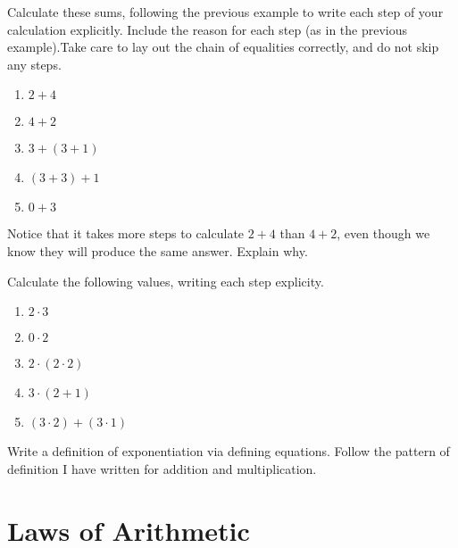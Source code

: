 \begin{exer}
\begin{exercise}
\item Calculate these sums, following the previous example to write
  each step of your calculation explicitly. Include the reason for
  each step (as in the previous example).Take care to lay out the
  chain of equalities correctly, and do not skip any steps.
\begin{enumerate}
\item $2+4$
\item $4+2$
\item $3+(3+1)$
\item $(3+3)+1$
\item $0 + 3$
\end{enumerate}

\item Notice that it takes more steps to calculate $2+4$ than $4+2$, even though we know they will produce the same answer. Explain why.

\item Calculate the following values, writing each step explicity. 
 \begin{enumerate}
    \item $2\cdot 3$
    \item $0\cdot 2$
    \item $2\cdot(2\cdot 2)$
    \item $3\cdot(2 + 1)$
    \item $(3\cdot 2) + (3\cdot 1)$
    \end{enumerate}
\item Write a definition of exponentiation via defining equations. Follow the pattern
of definition I have written for addition and multiplication.
\end{exercise}
\end{exer}

\chapter{Laws of Arithmetic}\label{lec:ArithmeticLaws}

